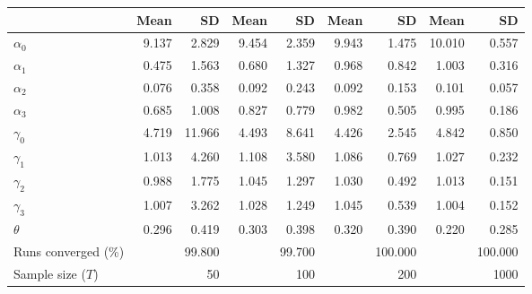 
\begin{tabular}[t]{lrrrrrrrr}
\toprule
  & Mean & SD & Mean  & SD  & Mean   & SD   & Mean    & SD   \\
\midrule
$\alpha_{0}$ & 9.137 & 2.829 & 9.454 & 2.359 & 9.943 & 1.475 & 10.010 & 0.557\\
$\alpha_{1}$ & 0.475 & 1.563 & 0.680 & 1.327 & 0.968 & 0.842 & 1.003 & 0.316\\
$\alpha_{2}$ & 0.076 & 0.358 & 0.092 & 0.243 & 0.092 & 0.153 & 0.101 & 0.057\\
$\alpha_{3}$ & 0.685 & 1.008 & 0.827 & 0.779 & 0.982 & 0.505 & 0.995 & 0.186\\
$\gamma_{0}$ & 4.719 & 11.966 & 4.493 & 8.641 & 4.426 & 2.545 & 4.842 & 0.850\\
$\gamma_{1}$ & 1.013 & 4.260 & 1.108 & 3.580 & 1.086 & 0.769 & 1.027 & 0.232\\
$\gamma_{2}$ & 0.988 & 1.775 & 1.045 & 1.297 & 1.030 & 0.492 & 1.013 & 0.151\\
$\gamma_{3}$ & 1.007 & 3.262 & 1.028 & 1.249 & 1.045 & 0.539 & 1.004 & 0.152\\
$\theta$ & 0.296 & 0.419 & 0.303 & 0.398 & 0.320 & 0.390 & 0.220 & 0.285\\
Runs converged (\%) &  & 99.800 &  & 99.700 &  & 100.000 &  & 100.000\\
Sample size ($T$) &  & 50 &  & 100 &  & 200 &  & 1000\\
\bottomrule
\end{tabular}
